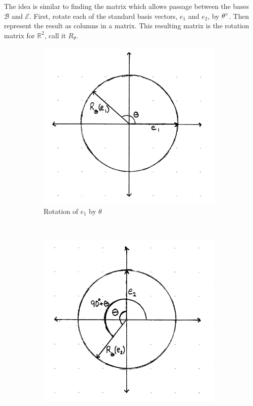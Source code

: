 \documentclass[12pt,letter]{article}
\begin{document}
The idea is similar to finding the matrix which allows passage between the bases $\mathcal{B}$ and $\mathcal{E}$. First, rotate each of the standard basis vectors, $e_1$ and $e_2$, by $\theta\degree$. Then represent the result as columns in a matrix. This resulting matrix is the rotation matrix for $\mathbb{R}^2$, call it $R_\theta$. 

\begin{figure}[h]
	\caption{Rotation of Basis Vectors $e_1$ and $e_2$}
	\centering
	\begin{subfigure}[h]{0.45\textwidth}
		\includegraphics[width = \textwidth]{rotation_e1.pdf}
		\caption{Rotation of $e_1$ by $\theta$}
		\label{fig:rotate_e1}
	\end{subfigure}
	~
	\begin{subfigure}[h]{0.45\textwidth}
		\includegraphics[width = \textwidth]{rotation_e2.pdf}

\end{subfigure}
\end{figure}
\end{document}
